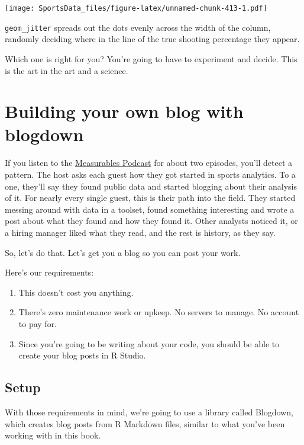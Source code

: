 \documentclass[
]{book}
\providecommand{\tightlist}{%
  \setlength{\itemsep}{0pt}\setlength{\parskip}{0pt}}
\begin{document}
\texttt{[image: SportsData\_files/figure-latex/unnamed-chunk-413-1.pdf]}

\texttt{geom\_jitter} spreads out the dots evenly across the width of the column, randomly deciding where in the line of the true shooting percentage they appear.

Which one is right for you? You're going to have to experiment and decide. This is the art in the art and a science.

\hypertarget{building-your-own-blog-with-blogdown}{%
\chapter{Building your own blog with blogdown}\label{building-your-own-blog-with-blogdown}}

If you listen to the \href{https://www.measurablespod.com/podcast}{Measurables Podcast} for about two episodes, you'll detect a pattern. The host asks each guest how they got started in sports analytics. To a one, they'll say they found public data and started blogging about their analysis of it. For nearly every single guest, this is their path into the field. They started messing around with data in a toolset, found something interesting and wrote a post about what they found and how they found it. Other analysts noticed it, or a hiring manager liked what they read, and the rest is history, as they say.

So, let's do that. Let's get you a blog so you can post your work.

Here's our requirements:

\begin{enumerate}
\def\labelenumi{\arabic{enumi}.}
\tightlist
\item
  This doesn't cost you anything.
\item
  There's zero maintenance work or upkeep. No servers to manage. No account to pay for.
\item
  Since you're going to be writing about your code, you should be able to create your blog posts in R Studio.
\end{enumerate}

\hypertarget{setup}{%
\section{Setup}\label{setup}}

With those requirements in mind, we're going to use a library called Blogdown, which creates blog posts from R Markdown files, similar to what you've been working with in this book.
\end{document}
